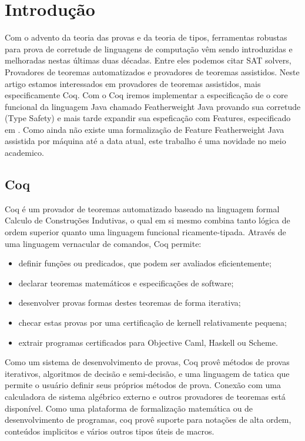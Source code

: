 \chapter{Introdução}

	Com o advento da teoria das provas e da teoria de tipos, ferramentas robustas para prova de corretude de linguagens de computação vêm sendo introduzidas e melhoradas nestas últimas duas décadas. Entre eles podemos citar SAT solvers, Provadores de teoremas automatizados e provadores de teoremas assistidos.
	Neste artigo estamos interessados em provadores de teoremas assistidos, mais especificamente Coq. 
	Com o Coq iremos implementar a especificação de o core funcional da linguagem Java chamado Featherweight Java \cite{Igarashi99featherweightjava:} provando sua corretude (Type Safety) e mais tarde expandir sua espeficação com Features, especificado em \cite{Apel08featurefeatherweight}. Como ainda não existe uma formalização de Feature Featherweight Java assistida por máquina até a data atual, este trabalho é uma novidade no meio academico.
	
	\section{Coq}
	Coq é um provador de teoremas automatizado  baseado na linguagem formal Calculo de Construções Indutivas, o qual em si mesmo combina tanto lógica de ordem superior quanto uma linguagem funcional ricamente-tipada. Através de uma linguagem vernacular de comandos, Coq permite:
	\begin{itemize}
		\item definir funções ou predicados, que podem ser avaliados eficientemente;
		\item declarar teoremas matemáticos e especificações de software;
		\item desenvolver provas formas destes teoremas de forma iterativa;
		\item checar estas provas por uma certificação de kernell relativamente pequena;
		\item extrair programas certificados para Objective Caml, Haskell ou Scheme.
	\end{itemize}
	Como um sistema de desenvolvimento de provas, Coq provê métodos de provas iterativos, algoritmos de decisão e semi-decisão, e uma linguagem de tatica que permite o usuário definir seus próprios métodos de prova. Conexão com uma calculadora de sistema algébrico externo e outros provadores de teoremas está disponível.
	Como uma plataforma de formalização matemática ou de desenvolvimento de programas, coq provê suporte para notações de alta ordem, conteúdos implicitos e vários outros tipos úteis de macros.







